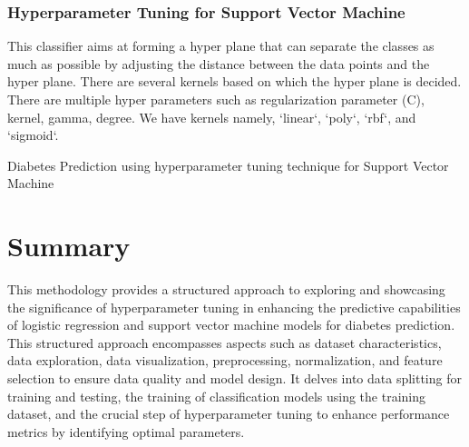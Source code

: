 \subsubsection{Hyperparameter Tuning for Support Vector Machine}
This classifier aims at forming a hyper plane that can separate the classes as much as possible by adjusting the 
distance between the data points and the hyper plane. There are several kernels based on which the hyper plane is decided. There are multiple hyper parameters such as regularization parameter (C), kernel, gamma, degree.  We have kernels namely, `linear`, `poly`, `rbf`, and `sigmoid`. 
\begin{algorithm}
    \caption{Diabetes Prediction using hyperparameter tuning technique for Support Vector Machine}
    \label{algo:algo_hp_svm}
    \begin{algorithmic}[1]
        \Statex
    \end{algorithmic}
\end{algorithm}

\section{Summary}
 This methodology provides a structured approach to exploring and showcasing the significance of hyperparameter tuning in enhancing the predictive capabilities of logistic regression and support vector machine models for diabetes prediction. This structured approach encompasses aspects such as dataset characteristics, data exploration, data visualization, preprocessing, normalization, and feature selection to ensure data quality and model design. It delves into data splitting for training and testing, the training of classification models using the training dataset, and the crucial step of hyperparameter tuning to enhance performance metrics by identifying optimal parameters.
 


